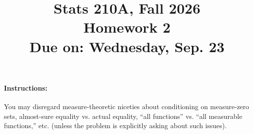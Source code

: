\documentclass{article}
\theoremstyle{definition}
\begin{document}
\title{Stats 210A, Fall 2026\\
  Homework 2 \\
  {\large {\bf Due on}: Wednesday, Sep. 23}}
\date{}

\maketitle

\paragraph{Instructions:} You may disregard measure-theoretic niceties about conditioning on measure-zero sets, almost-sure equality vs. actual equality, ``all functions'' vs. ``all measurable functions,'' etc. (unless the problem is explicitly asking about such issues).
\end{document}
